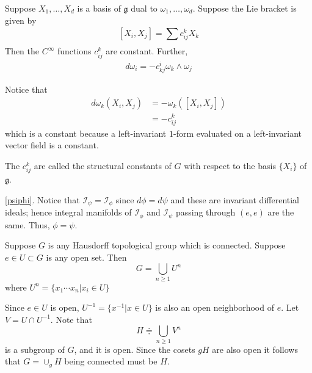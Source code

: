 \documentclass[11pt,a4paper]{scrarticle}
\theoremstyle{definition}
\renewenvironment{proof}[1][\proofname]{\vspace{-15pt}\begin{myproof}}{\end{myproof}}
\theoremstyle{greenbox}
\newcommand{\define}{\doteqdot}
\begin{document}
    \begin{lemma}
        Suppose $ X_{1}, \ldots, X_{d} $ is a basis of $ \mathfrak{g} $ dual to $ \omega_{1}, \ldots, \omega_{d} $. Suppose the Lie bracket is given by 
        \[ [X_{i},X_{j}]  = \sum_{}^{} c_{ij}^{k}X_{k} \]
        Then the $ C^{\infty} $ functions $ c_{ij}^{k} $ are constant. Further, \begin{align*}
            d \omega_{i} = -c_{kj}^{i} \omega_{k} \wedge \omega_{j}
        \end{align*}
    \end{lemma}
    \begin{proof}
        Notice that \begin{align*}
            d \omega_{k}(X_{i},X_{j}) & = - \omega_{k}([X_{i},X_{j}]) \\
            & = - c_{ij}^{k} 
        \end{align*}
        which is a constant because a left-invariant $ 1 $-form evaluated on a left-invariant vector field is a constant.  
    \end{proof}
    \begin{remark}
        The $ c_{ij}^{k} $ are called the structural constants of $ G $ with respect to the basis $ \{X_{i}\} $ of $ \mathfrak{g} $.
    \end{remark}
    \vspace{1cm}
    \begin{proof}
        \cref{psiphi}. Notice that $ \mathcal{I}_{\psi} = \mathcal{I}_{\phi} $ since $ d \phi = d \psi $ and these are invariant differential ideals; hence integral manifolds of $ \mathcal{I}_{\phi} $ and $ \mathcal{I}_{\psi} $ passing through $ (e,e) $ are the same. Thus, $ \phi = \psi $.
    \end{proof}

    \begin{lemma}
        Suppose $ G $ is any Hausdorff topological group which is connected. Suppose $ e \in U \subset G $ is any open set. Then 
        \[ G = \bigcup_{n \ge 1} U^{n}\]
        where $ U^{n} = \{x_{1} \cdots x_{n} |  x_{i} \in U\} $
    \end{lemma}
    \begin{proof}
        Since $ e \in U$ is open, $ U^{-1}  = \{x^{-1}| x \in U\}$ is also an open neighborhood of $ e $. Let $ V = U \cap U^{-1} $. Note that 
        \[ H \define \bigcup_{n \ge 1}V^{n} \]
        is a subgroup of $ G $, and it is open. Since the cosets $ gH $ are also open it follows that $ G =  \cup_{g}H $ being connected must be $ H $.
        
    \end{proof}
\end{document}

